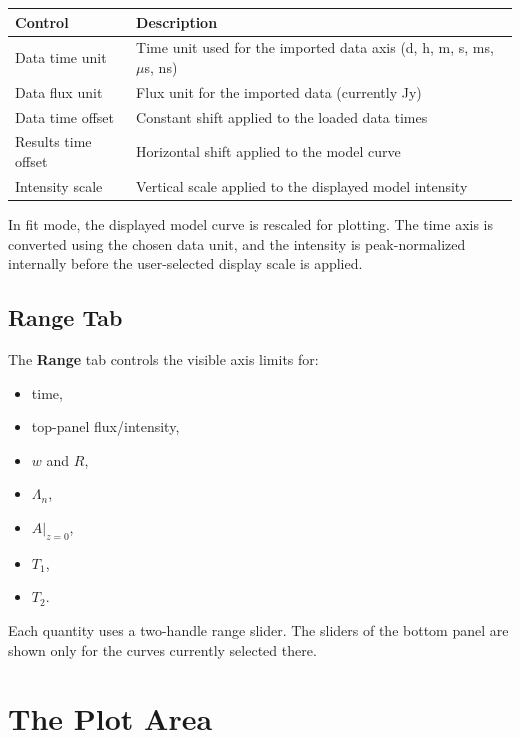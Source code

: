 \documentclass[12pt,a4paper]{article}
\newcommand{\tab}[1]{\textbf{#1}}
\begin{document}
\begin{center}
\begin{tabular}{@{}ll@{}}
  \toprule
  Control & Description \\
  \midrule
  Data time unit & Time unit used for the imported data axis (d, h, m, s, ms, $\mu$s, ns) \\
  Data flux unit & Flux unit for the imported data (currently Jy) \\
  Data time offset & Constant shift applied to the loaded data times \\
  Results time offset & Horizontal shift applied to the model curve \\
  Intensity scale & Vertical scale applied to the displayed model intensity \\
  \bottomrule
\end{tabular}
\end{center}

\begin{notebox}
In fit mode, the displayed model curve is rescaled for plotting. The time axis is converted using the chosen data
unit, and the intensity is peak-normalized internally before the user-selected display scale is applied.
\end{notebox}

\subsection{Range Tab}

The \tab{Range} tab controls the visible axis limits for:
\begin{itemize}[noitemsep]
  \item time,
  \item top-panel flux/intensity,
  \item $w$ and $R$,
  \item $\Lambda_n$,
  \item $A\vert_{z=0}$,
  \item $T_1$,
  \item $T_2$.
\end{itemize}
Each quantity uses a two-handle range slider. The sliders of the bottom panel are shown only
for the curves currently selected there.

\section{The Plot Area}
\end{document}

